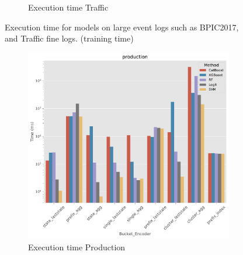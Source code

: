 \begin{figure}[!htbp]
\begin{subfigure}{0.48\textwidth}
		\caption{Execution time Traffic} \label{fig:t2}
	\end{subfigure}\hspace*{\fill}
	\caption[Execution time comparison (offline)]{Execution time for models on large event logs such as BPIC2017, and Traffic fine logs. (training time)}
\label{fig:T1}
\end{figure}

\begin{figure}[!htbp] %
	
	\begin{subfigure}{0.48\textwidth}
		\includegraphics[width=\linewidth]{images/catboost/time/catboost/offline/production.pdf}
		\caption{Execution time Production} \label{fig:t3}
	\end{subfigure}\hspace*{\fill}
	\begin{subfigure}{0.48\textwidth}

\end{subfigure}
\end{figure}

